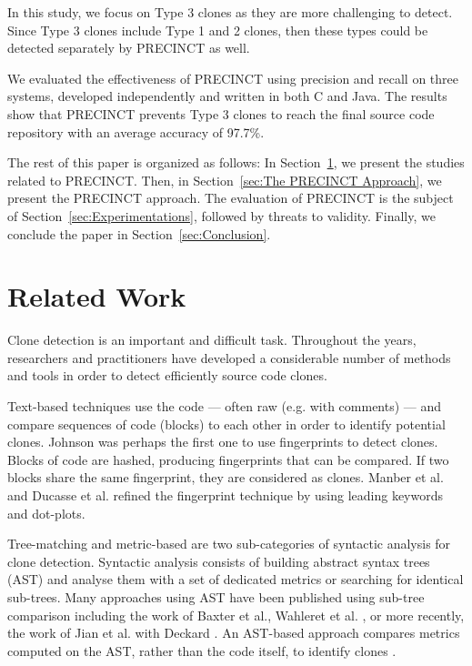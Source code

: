 \documentclass[conference]{IEEEtran}
\begin{document}
In this study, we focus on Type 3 clones as they are more challenging to detect. Since Type 3 clones include Type 1 and 2 clones, then these types could be detected separately by PRECINCT as well.

We evaluated the effectiveness of PRECINCT using precision and recall on three systems, developed independently and written in both C and Java. The results show that PRECINCT prevents Type 3 clones to reach the final source code repository with an average accuracy of 97.7\%.

The rest of this paper is organized as follows: In Section~\ref{sec:Related Work}, we present the studies related to PRECINCT. Then, in Section~\ref{sec:The PRECINCT Approach}, we present the PRECINCT approach. The evaluation of PRECINCT is the subject of  Section~\ref{sec:Experimentations}, followed by threats to validity.
Finally, we conclude the paper in Section~\ref{sec:Conclusion}.

\section{Related Work}
\label{sec:Related Work}

Clone detection is an important and difficult task. Throughout the years, researchers and practitioners have developed a considerable number of methods and tools in order to detect efficiently source code clones.

Text-based techniques use the code --- often raw (e.g. with comments) --- and compare sequences of code (blocks) to each other in order to identify potential clones. Johnson was perhaps the first one to use fingerprints to detect clones\cite{Johnson1993,Johnson1994}. Blocks of code are hashed, producing fingerprints that can be compared.
If two blocks share the same fingerprint, they are considered as clones.
Manber et al. \cite{Manber1994} and Ducasse et al.\cite{Ducasse1999} refined the fingerprint technique by using leading keywords and dot-plots.

Tree-matching and metric-based are two sub-categories of syntactic analysis for clone detection.
Syntactic analysis consists of building abstract syntax trees (AST) and analyse them with a set of dedicated metrics or searching for identical sub-trees.
Many approaches using AST have been published using sub-tree comparison including the work of Baxter et al.\cite{Baxter1998}, Wahleret et al. \cite{Wahler}, or more recently, the work of Jian et al. with Deckard \cite{Jiang2007}.
An AST-based approach compares metrics computed on the AST, rather than the code itself, to identify clones \cite{Patenaude1999, Balazinska}.
\end{document}
